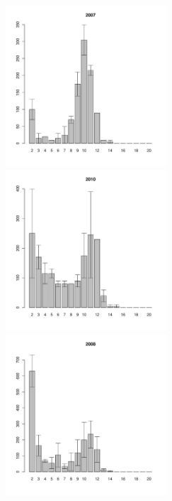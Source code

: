 \begin{figure}[hp]
\begin{minipage}[b]{.3\linewidth}
\begin{center}
	\end{center}
	\end{minipage}
	\begin{minipage}[b]{.3\linewidth}
	\begin{center}
	\includegraphics[width=60mm]{../White_Sea/Ryashkov_ZRS/zrs2_2007_.pdf}
	\end{center}
	\end{minipage}
	\hfill	
	\begin{minipage}[b]{.3\linewidth}
	\begin{center}
	\includegraphics[width=60mm]{../White_Sea/Ryashkov_ZRS/zrs2_2010_.pdf}
	\end{center}
	\end{minipage}
	\hfill
	\begin{minipage}[b]{.3\linewidth}
	\begin{center}
	\end{center}
	\end{minipage}
	\begin{minipage}[b]{.3\linewidth}
	\begin{center}
	\includegraphics[width=60mm]{../White_Sea/Ryashkov_ZRS/zrs2_2008_.pdf}

\end{center}
\end{minipage}
\end{figure}
